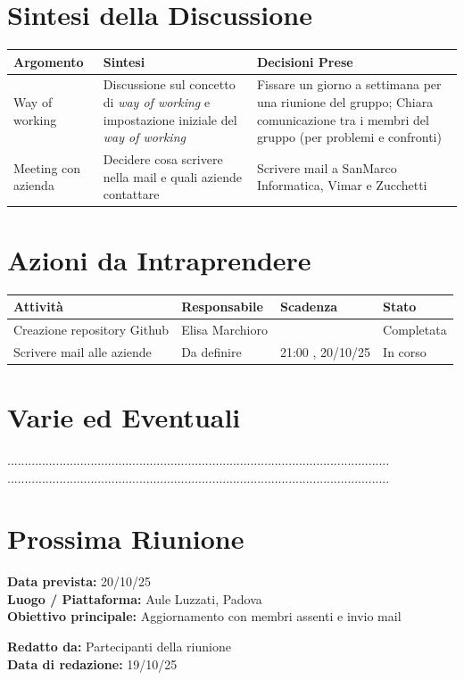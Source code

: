 \documentclass[a4paper,12pt]{article}
\begin{document}
\section*{ Sintesi della Discussione}

\begin{longtable}{|p{}|p{}|p{}|}
\hline
\textbf{Argomento} & \textbf{Sintesi} & \textbf{Decisioni Prese} \\ \hline
Way of working & Discussione sul concetto di \textit{way of working} e impostazione iniziale del \textit{way of working}& Fissare un giorno a settimana per una riunione del gruppo; Chiara comunicazione tra i membri del gruppo (per problemi e confronti) \\ \hline
 Meeting con azienda & Decidere cosa scrivere nella mail e quali aziende contattare & Scrivere mail a SanMarco Informatica, Vimar e Zucchetti \\ \hline
\end{longtable}


\section*{ Azioni da Intraprendere}

\begin{longtable}{|p{}|p{}|p{}|p{}|}
\hline
\textbf{Attività} & \textbf{Responsabile} & \textbf{Scadenza} & \textbf{Stato} \\ \hline
Creazione repository Github &  Elisa Marchioro &  & Completata \\ \hline
 Scrivere mail alle aziende & Da definire & 21:00 , 20/10/25 &  In corso\\ \hline
\end{longtable}


\section*{ Varie ed Eventuali}
..............................................................................................................\\
..............................................................................................................


\section*{ Prossima Riunione}
\textbf{Data prevista:} 20/10/25 \\
\textbf{Luogo / Piattaforma:} Aule Luzzati, Padova \\
\textbf{Obiettivo principale:} Aggiornamento con membri assenti e invio mail


\textbf{Redatto da:} Partecipanti della riunione \\
\textbf{Data di redazione:} 19/10/25
\end{document}
